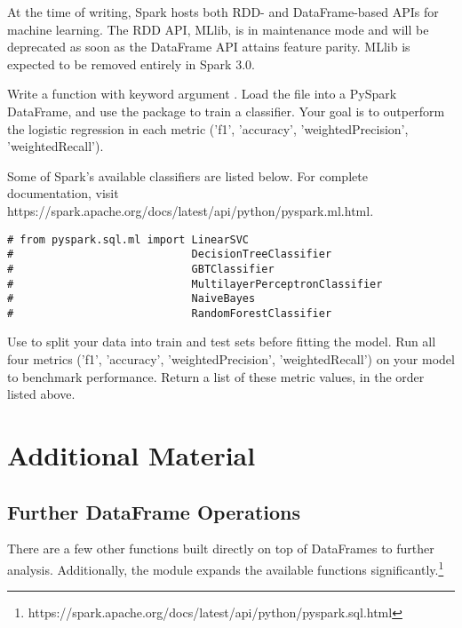 \begin{warn}
At the time of writing, Spark hosts both RDD- and DataFrame-based APIs for machine learning. 
The RDD API, MLlib, is in maintenance mode and will be deprecated as soon as the DataFrame API attains feature parity. 
MLlib is expected to be removed entirely in Spark 3.0.
\end{warn}

\begin{problem}
Write a function with keyword argument . Load the file into a PySpark DataFrame, and use the  package to train a classifier. Your goal is to outperform the logistic regression in each metric ('f1', 'accuracy', 'weightedPrecision', 'weightedRecall'). 

Some of Spark's available classifiers are listed below. For complete documentation, visit https://spark.apache.org/docs/latest/api/python/pyspark.ml.html.

\begin{lstlisting}
# from pyspark.sql.ml import LinearSVC
#                            DecisionTreeClassifier
#                            GBTClassifier
#                            MultilayerPerceptronClassifier
#                            NaiveBayes
#                            RandomForestClassifier
\end{lstlisting}

Use  to split your data into train and test sets before fitting the model. Run all four metrics ('f1', 'accuracy', 'weightedPrecision', 'weightedRecall') on your model to benchmark performance. Return a list of these metric values, in the order listed above.
\label{prob:spark-ml-titanic}
\end{problem}


\newpage

\section*{Additional Material} %

\subsection*{Further DataFrame Operations}

There are a few other functions built directly on top of DataFrames to further analysis. 
Additionally, the  module expands the available functions significantly.\footnote{https://spark.apache.org/docs/latest/api/python/pyspark.sql.html}

